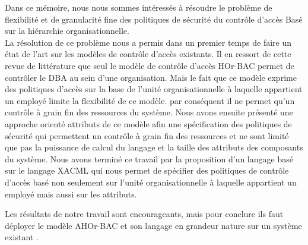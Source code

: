 
Dans ce mémoire, nous nous sommes intéressés à résoudre le problème de flexibilité et de granularité fine des politiques de sécurité du contrôle d'accès Basé sur la hiérarchie organisationnelle.\\
\hspace*{0.5cm} La résolution de ce problème nous a permis dans un premier temps de faire un état de l'art sur les modèles de contrôle d'accès existants. Il en ressort de cette revue de littérature que seul le modèle de contrôle d'accès HOr-BAC permet de contrôler le DBA au sein d'une organisation. Mais le fait que ce modèle exprime des politiques d'accès sur la base de l'unité organisationnelle à laquelle appartient un employé limite la flexibilité de ce modèle. par conséquent il ne permet qu'un contrôle à grain fin des ressources du système. Nous avons ensuite présenté une approche orienté attributs de ce modèle afin une spécification des politiques de sécurité qui permettent un contrôle à grain fin des ressources et ne sont limité que pas la puissance de calcul du langage et la taille des attributs des composants du système. Nous avons terminé ce travail par la proposition d'un langage basé sur le langage XACML qui nous permet de spécifier des politiques de contrôle d'accès basé non seulement sur l'unité organisationnelle à laquelle appartient un employé mais aussi sur les attributs. 


Les résultats de notre travail sont encourageants, mais pour conclure ils faut déployer le modèle AHOr-BAC et son langage en grandeur nature sur un système existant .



\myCleanStarChapterEnd
